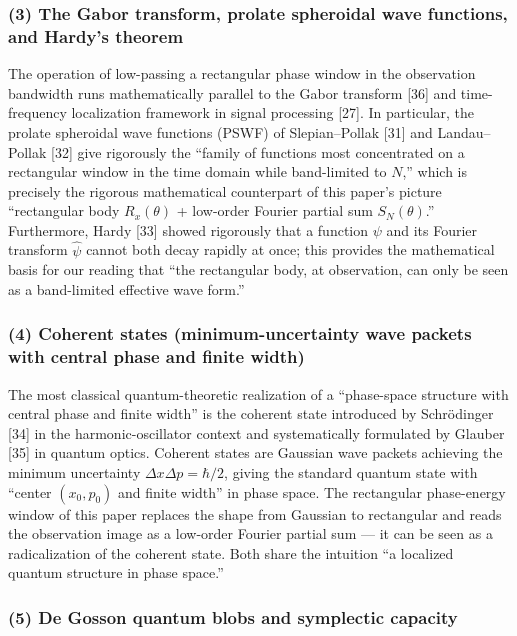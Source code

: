 \documentclass[
]{article}
\begin{document}
\subsubsection{(3) The Gabor transform, prolate spheroidal wave
functions, and Hardy's
theorem}\label{the-gabor-transform-prolate-spheroidal-wave-functions-and-hardys-theorem}

The operation of low-passing a rectangular phase window in the
observation bandwidth runs mathematically parallel to the Gabor
transform {[}36{]} and time-frequency localization framework in signal
processing {[}27{]}. In particular, the prolate spheroidal wave
functions (PSWF) of Slepian--Pollak {[}31{]} and Landau--Pollak {[}32{]}
give rigorously the ``family of functions most concentrated on a
rectangular window in the time domain while band-limited to \(N\),''
which is precisely the rigorous mathematical counterpart of this paper's
picture ``rectangular body \(R_x(\theta)\) + low-order Fourier partial
sum \(S_N(\theta)\).'' Furthermore, Hardy {[}33{]} showed rigorously
that a function \(\psi\) and its Fourier transform \(\widehat{\psi}\)
cannot both decay rapidly at once; this provides the mathematical basis
for our reading that ``the rectangular body, at observation, can only be
seen as a band-limited effective wave form.''

\subsubsection{(4) Coherent states (minimum-uncertainty wave packets
with central phase and finite
width)}\label{coherent-states-minimum-uncertainty-wave-packets-with-central-phase-and-finite-width}

The most classical quantum-theoretic realization of a ``phase-space
structure with central phase and finite width'' is the coherent state
introduced by Schrödinger {[}34{]} in the harmonic-oscillator context
and systematically formulated by Glauber {[}35{]} in quantum optics.
Coherent states are Gaussian wave packets achieving the minimum
uncertainty \(\Delta x \Delta p = \hbar/2\), giving the standard quantum
state with ``center \((x_0, p_0)\) and finite width'' in phase space.
The rectangular phase-energy window of this paper replaces the shape
from Gaussian to rectangular and reads the observation image as a
low-order Fourier partial sum --- it can be seen as a radicalization of
the coherent state. Both share the intuition ``a localized quantum
structure in phase space.''

\subsubsection{(5) De Gosson quantum blobs and symplectic
capacity}\label{de-gosson-quantum-blobs-and-symplectic-capacity}
\end{document}
